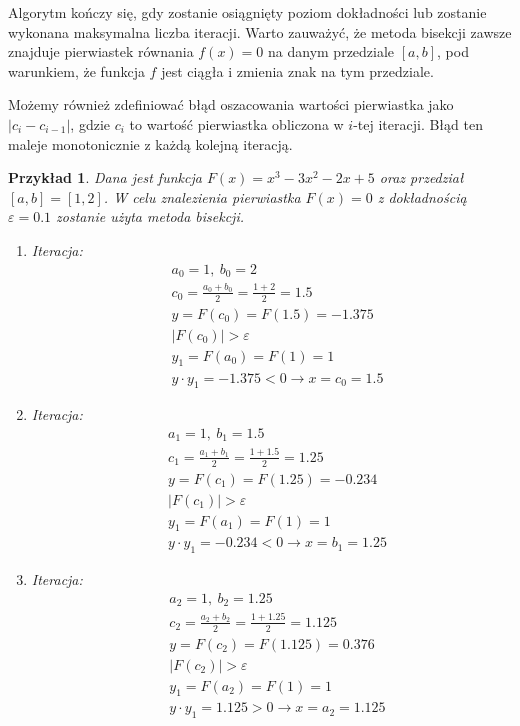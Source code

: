 \documentclass[12pt]{article}
\newtheorem{example}{Przykład}
\begin{document}
Algorytm kończy się, gdy zostanie osiągnięty poziom dokładności lub zostanie wykonana maksymalna liczba iteracji. Warto zauważyć, że metoda bisekcji zawsze znajduje pierwiastek równania $f(x) = 0$ na danym przedziale $[a,b]$, pod warunkiem, że funkcja $f$ jest ciągła i zmienia znak na tym przedziale.

Możemy również zdefiniować błąd oszacowania wartości pierwiastka jako $|c_i - c_{i-1}|$, gdzie $c_i$ to wartość pierwiastka obliczona w $i$-tej iteracji. Błąd ten maleje monotonicznie z każdą kolejną iteracją.

\begin{example}
Dana jest funkcja $F(x) = x^3 - 3x^2 - 2x + 5$ oraz przedział $[a, b] = [1,2]$.
W celu znalezienia pierwiastka $F(x) = 0$ z dokładnością $\varepsilon = 0.1$ zostanie użyta metoda bisekcji.

\begin{enumerate}
    \item Iteracja:\\
    \begin{align*}
        &a_0=1,\ b_0=2\\
        &c_0=\frac{a_0+b_0}{2}=\frac{1+2}{2}=1.5\\
        &y=F(c_0)=F(1.5)=-1.375\\
        &|F(c_0)|>\varepsilon\\
        &y_1=F(a_0)=F(1)=1\\
        &y\cdot y_1=-1.375<0\rightarrow x=c_0=1.5
    \end{align*}
    
    \item Iteracja:\\
    \begin{align*}
        &a_1=1,\ b_1=1.5\\
        &c_1=\frac{a_1+b_1}{2}=\frac{1+1.5}{2}=1.25\\
        &y=F(c_1)=F(1.25)=-0.234\\
        &|F(c_1)|>\varepsilon\\
        &y_1=F(a_1)=F(1)=1\\
        &y\cdot y_1=-0.234<0\rightarrow x=b_1=1.25
    \end{align*}

    
    \item Iteracja:\\
    \begin{align*}
        &a_2=1,\ b_2=1.25\\
        &c_2=\frac{a_2+b_2}{2}=\frac{1+1.25}{2}=1.125\\
        &y=F(c_2)=F(1.125)=0.376\\
        &|F(c_2)|>\varepsilon\\
        &y_1=F(a_2)=F(1)=1\\
        &y\cdot y_1=1.125>0\rightarrow x=a_2=1.125
    \end{align*}
    

\end{enumerate}
\end{example}
\end{document}
